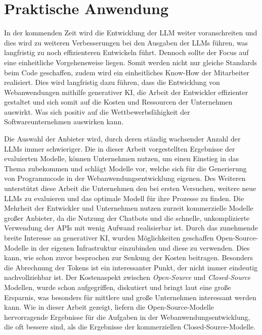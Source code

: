\section{Praktische Anwendung}
In der kommenden Zeit wird die Entwicklung der LLM weiter voranschreiten und dies wird zu weiteren Verbesserungen bei den Ausgaben der LLMs führen, was langfristig zu noch effizienteren Entwickeln führt. Dennoch sollte der Focus auf eine einheitliche Vorgehensweise liegen. Somit werden nicht nur gleiche Standards beim Code geschaffen, zudem wird ein einheitliches Know-How der Mitarbeiter realisiert. Dies wird langfristig dazu führen, dass die Entwicklung von Webanwendungen mithilfe generativer KI, die Arbeit der Entwickler effizienter gestaltet und sich somit auf die Kosten und Ressourcen der Unternehmen auswirkt. Was sich positiv auf die Wettbewerbsfähigkeit der Softwareunternehmen auswirken kann.\vspace{0.2cm}

Die Auswahl der Anbieter wird, durch deren ständig wachsender Anzahl der LLMs immer schwieriger. Die in dieser Arbeit vorgestellten Ergebnisse der evaluierten Modelle, können Unternehmen nutzen, um einen Einstieg in das Thema zubekommen und schlägt Modelle vor, welche sich für die Generierung von Programmcode in der Webanwendungsentwicklung eigenen. Des Weiteren unterstützt diese Arbeit die Unternehmen den bei ersten Versuchen, weitere neue LLMs zu evaluieren und das optimale Modell für ihre Prozesse zu finden. Die Mehrheit der Entwickler und Unternehmen nutzen zurzeit kommerzielle Modelle großer Anbieter, da die Nutzung der Chatbots und die schnelle, unkomplizierte Verwendung der APIs mit wenig Aufwand realisierbar ist. Durch das zunehmende breite Interesse an generativer KI, wurden Möglichkeiten geschaffen Open-Source-Modelle in der eigenen Infrastruktur einzubinden und diese zu verwenden. Dies kann, wie schon zuvor besprochen zur Senkung der Kosten beitragen. Besonders die Abrechnung der Tokens ist ein interessanter Punkt, der nicht immer eindeutig nachvollziehbar ist. Der Kostenaspekt zwischen \textit{Open-Source} und \textit{Closed-Source} Modellen, wurde schon aufgegriffen, diskutiert und bringt laut \cite{irugalbandara-2023} eine große Ersparnis, was besonders für mittlere und große Unternehmen interessant werden kann. Wie in dieser Arbeit gezeigt, liefern die Open-Source-Modelle hervorragende Ergebnisse für die Aufgaben in der Webanwendungsentwicklung, die oft bessere sind, als die Ergebnisse der kommerziellen Closed-Source-Modelle.\vspace{0.2cm}

